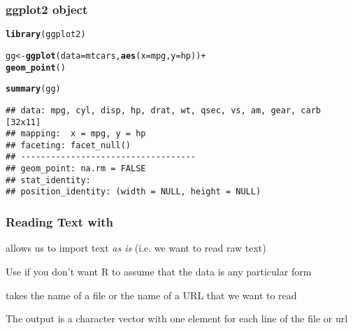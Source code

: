 \documentclass[12pt]{beamer}\usepackage[]{graphicx}\usepackage[]{color}
\makeatletter
\newcommand{\hlopt}[1]{\textcolor[rgb]{0,0,0}{#1}}%
\newcommand{\hlstd}[1]{\textcolor[rgb]{0.345,0.345,0.345}{#1}}%
\newcommand{\hlkwb}[1]{\textcolor[rgb]{0.69,0.353,0.396}{#1}}%
\newcommand{\hlkwc}[1]{\textcolor[rgb]{0.333,0.667,0.333}{#1}}%
\newcommand{\hlkwd}[1]{\textcolor[rgb]{0.737,0.353,0.396}{\textbf{#1}}}%
\newenvironment{kframe}{%
 \def\at@end@of@kframe{}%
 \ifinner\ifhmode%
  \def\at@end@of@kframe{\end{minipage}}%
  \begin{minipage}{\columnwidth}%
 \fi\fi%
 \def\FrameCommand##1{\hskip\@totalleftmargin \hskip-\fboxsep
 \colorbox{shadecolor}{##1}\hskip-\fboxsep
     \hskip-\linewidth \hskip-\@totalleftmargin \hskip\columnwidth}%
 \MakeFramed {\advance\hsize-\width
   \@totalleftmargin\z@ \linewidth\hsize
   \@setminipage}}%
 {\par\unskip\endMakeFramed%
 \at@end@of@kframe}
\newenvironment{knitrout}{}{} %
\makeatother
\begin{document}

\begin{frame}[fragile]
\frametitle{ggplot2 object}

\begin{knitrout}\scriptsize
{}\color{fgcolor}\begin{kframe}
\begin{alltt}
\hlkwd{library}\hlstd{(ggplot2)}

\hlstd{gg} \hlkwb{<-} \hlkwd{ggplot}\hlstd{(}\hlkwc{data} \hlstd{= mtcars,} \hlkwd{aes}\hlstd{(}\hlkwc{x} \hlstd{= mpg,} \hlkwc{y} \hlstd{= hp))} \hlopt{+}
  \hlkwd{geom_point}\hlstd{()}

\hlkwd{summary}\hlstd{(gg)}
\end{alltt}
\begin{verbatim}
## data: mpg, cyl, disp, hp, drat, wt, qsec, vs, am, gear, carb [32x11]
## mapping:  x = mpg, y = hp
## faceting: facet_null() 
## -----------------------------------
## geom_point: na.rm = FALSE 
## stat_identity:  
## position_identity: (width = NULL, height = NULL)
\end{verbatim}
\end{kframe}
\end{knitrout}

\end{frame}


\begin{frame}
\begin{center}
\Huge{}
\end{center}
\end{frame}


\begin{frame}
\frametitle{Reading Text with }

\bi
  \item {\hilit {}} allows us to import text \textit{as is} (i.e. we want to read raw text)
  \item Use  if you don't want R to assume that the data is any particular form
  \item {} takes the name of a file or the name of a URL that we want to read
  \item The output is a character vector with one element for each line of the file or url
\ei
  
\end{frame}
\end{document}
